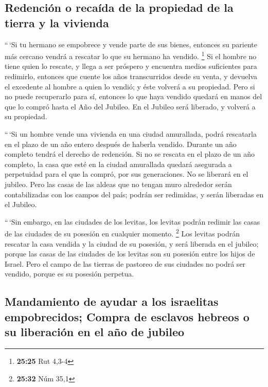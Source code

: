 \hypertarget{redenciuxf3n-o-recauxedda-de-la-propiedad-de-la-tierra-y-la-vivienda}{%
\subsection{Redención o recaída de la propiedad de la tierra y la
vivienda}\label{redenciuxf3n-o-recauxedda-de-la-propiedad-de-la-tierra-y-la-vivienda}}

 ``\,`Si tu hermano se empobrece y vende parte de sus
bienes, entonces su pariente más cercano vendrá a rescatar lo que su
hermano ha vendido. \footnote{\textbf{25:25} Rut 4,3-4} 
Si el hombre no tiene quien lo rescate, y llega a ser próspero y
encuentra medios suficientes para redimirlo,  entonces
que cuente los años transcurridos desde su venta, y devuelva el
excedente al hombre a quien lo vendió; y éste volverá a su propiedad.
 Pero si no puede recuperarlo para sí, entonces lo que
haya vendido quedará en manos del que lo compró hasta el Año del
Jubileo. En el Jubileo será liberado, y volverá a su propiedad.

 ``\,`Si un hombre vende una vivienda en una ciudad
amurallada, podrá rescatarla en el plazo de un año entero después de
haberla vendido. Durante un año completo tendrá el derecho de redención.
 Si no se rescata en el plazo de un año completo, la casa
que esté en la ciudad amurallada quedará asegurada a perpetuidad para el
que la compró, por sus generaciones. No se liberará en el jubileo.
 Pero las casas de las aldeas que no tengan muro
alrededor serán contabilizadas con los campos del país; podrán ser
redimidas, y serán liberadas en el Jubileo.

 ``\,`Sin embargo, en las ciudades de los levitas, los
levitas podrán redimir las casas de las ciudades de su posesión en
cualquier momento. \footnote{\textbf{25:32} Núm 35,1} 
Los levitas podrán rescatar la casa vendida y la ciudad de su posesión,
y será liberada en el jubileo; porque las casas de las ciudades de los
levitas son su posesión entre los hijos de Israel.  Pero
el campo de las tierras de pastoreo de sus ciudades no podrá ser
vendido, porque es su posesión perpetua.

\hypertarget{mandamiento-de-ayudar-a-los-israelitas-empobrecidos-compra-de-esclavos-hebreos-o-su-liberaciuxf3n-en-el-auxf1o-de-jubileo}{%
\subsection{Mandamiento de ayudar a los israelitas empobrecidos; Compra
de esclavos hebreos o su liberación en el año de
jubileo}\label{mandamiento-de-ayudar-a-los-israelitas-empobrecidos-compra-de-esclavos-hebreos-o-su-liberaciuxf3n-en-el-auxf1o-de-jubileo}}

